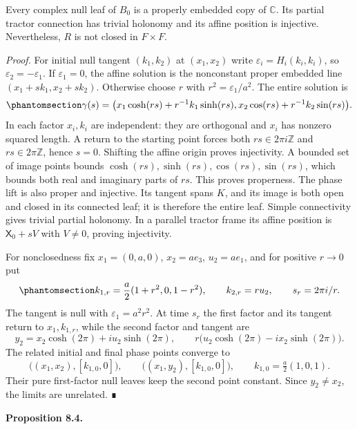 \documentclass[
  english,
  11pt,
  reqno]{amsart}
\makeatletter
\newcommand{\pandocstatementheading}[1]{%
  \par\addpenalty{\@beginparpenalty}%
  \addvspace{.5\baselineskip plus .2\baselineskip minus .2\baselineskip}%
  {\normalfont\bfseries #1\par}%
  \nobreak\@afterindenttrue\@afterheading
}
\makeatother
\begin{document}
Every complex null leaf of \(B_0\) is a properly embedded copy of
\(\mathbb C\). Its partial tractor connection has trivial holonomy and
its affine position is injective. Nevertheless, \(R\) is not closed in
\(F\times F\).

\emph{Proof.} For initial null tangent \((k_1,k_2)\) at \((x_1,x_2)\)
write \(\varepsilon_i=H_i(k_i,k_i)\), so
\(\varepsilon_2=-\varepsilon_1\). If \(\varepsilon_1=0\), the affine
solution is the nonconstant proper embedded line
\((x_1+sk_1,x_2+sk_2)\). Otherwise choose \(r\) with
\(r^2=\varepsilon_1/a^2\). The entire solution is
\begin{equation}\protect\phantomsection\label{eq:nariai-complex-null-geodesic}{
\gamma(s)=
\bigl(x_1\cosh(rs)+r^{-1}k_1\sinh(rs),
      x_2\cos(rs)+r^{-1}k_2\sin(rs)\bigr).
}\end{equation} In each factor \(x_i,k_i\) are independent: they are
orthogonal and \(x_i\) has nonzero squared length. A return to the
starting point forces both \(rs\in2\pi i\mathbb Z\) and
\(rs\in2\pi\mathbb Z\), hence \(s=0\). Shifting the affine origin proves
injectivity. A bounded set of image points bounds
\(\cosh(rs),\sinh(rs),\cos(rs),\sin(rs)\), which bounds both real and
imaginary parts of \(rs\). This proves properness. The phase lift is
also proper and injective. Its tangent spans \(K\), and its image is
both open and closed in its connected leaf; it is therefore the entire
leaf. Simple connectivity gives trivial partial holonomy. In a parallel
tractor frame its affine position is \(\mathsf X_0+sV\) with \(V\ne0\),
proving injectivity.

For nonclosedness fix \(x_1=(0,a,0)\), \(x_2=ae_3\), \(u_2=ae_1\), and
for positive \(r\to0\) put
\begin{equation}\protect\phantomsection\label{eq:nariai-nonclosed-sequence}{
k_{1,r}=\frac a2(1+r^2,0,1-r^2),
\qquad k_{2,r}=ru_2,
\qquad s_r=2\pi i/r.
}\end{equation} The tangent is null with \(\varepsilon_1=a^2r^2\). At
time \(s_r\) the first factor and its tangent return to \(x_1,k_{1,r}\),
while the second factor and tangent are \[
y_2=x_2\cosh(2\pi)+iu_2\sinh(2\pi),
\qquad r\bigl(u_2\cosh(2\pi)-ix_2\sinh(2\pi)\bigr).
\] The related initial and final phase points converge to \[
\bigl((x_1,x_2),[k_{1,0},0]\bigr),\qquad
\bigl((x_1,y_2),[k_{1,0},0]\bigr),
\qquad k_{1,0}=\tfrac a2(1,0,1).
\] Their pure first-factor null leaves keep the second point constant.
Since \(y_2\ne x_2\), the limits are unrelated. ∎

\pandocstatementheading{\protect{}\label{prop:nariai-restricted-quotient-v08}Proposition 8.4.}
\end{document}

